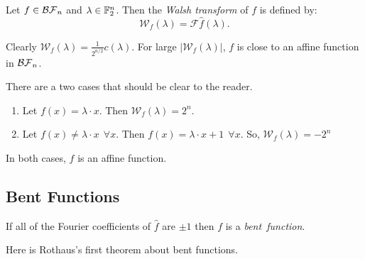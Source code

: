 \begin{definition}\label{def:walsh}
  Let $f\in\mathcal{BF}_n$ and $\lambda\in\mathbb{F}_2^n$. Then the {\em Walsh transform}
  of $f$ is defined by:
  \begin{equation}\label{eqn:walsh}
    \mathcal{W}_f(\lambda)=\mathcal{F}\hat{f}(\lambda).
  \end{equation}
\end{definition}

\par Clearly $\mathcal{W}_f(\lambda)=\frac{1}{2^{n/2}}c(\lambda)$. For large
$|\mathcal{W}_f(\lambda)|$, $f$ is close to an affine function in $\mathcal{BF}_n$.

\begin{example}
  There are a two cases that should be clear to the reader.
  \begin{enumerate}[1.]
    \item Let $f(x)=\lambda\cdot x$. Then $\mathcal{W}_f(\lambda)=2^n$.
    \item Let $f(x)\not=\lambda\cdot x \ \ \forall x$. Then $f(x)=
      \lambda\cdot x+1 \ \ \forall x$. So, $\mathcal{W}_f(\lambda)=-2^n$
  \end{enumerate}
  In both cases, $f$ is an affine function.
\end{example}

\subsection{Bent Functions}
\begin{definition}\label{def:bent-function}
  If all of the Fourier coefficients of $\hat{f}$ are $\pm1$ then
  $f$ is a {\em bent\ function}.
\end{definition}

\par Here is Rothaus's first theorem about bent functions.

